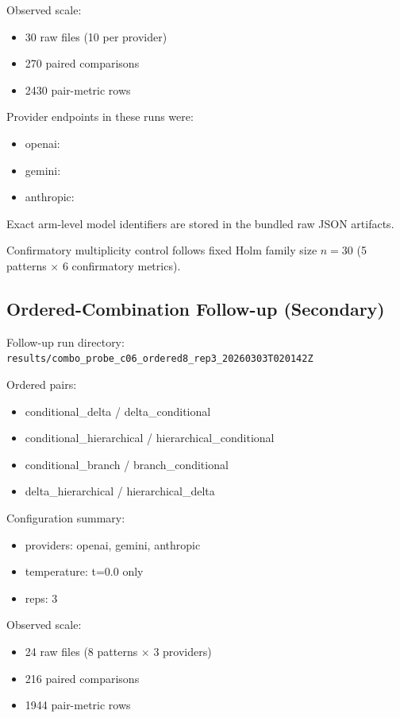\documentclass[11pt,a4paper]{article}
\begin{document}
Observed scale:
\begin{itemize}
  \item 30 raw files (10 per provider)
  \item 270 paired comparisons
  \item 2430 pair-metric rows
\end{itemize}

Provider endpoints in these runs were:
\begin{itemize}
  \item openai: 
  \item gemini: 
  \item anthropic: 
\end{itemize}
Exact arm-level model identifiers are stored in the bundled raw JSON artifacts.

Confirmatory multiplicity control follows fixed Holm family size $n=30$ (5 patterns $\times$ 6 confirmatory metrics).

\subsection{Ordered-Combination Follow-up (Secondary)}

Follow-up run directory:
\texttt{results/combo\_probe\_c06\_ordered8\_rep3\_20260303T020142Z}

Ordered pairs:
\begin{itemize}
  \item conditional\_delta / delta\_conditional
  \item conditional\_hierarchical / hierarchical\_conditional
  \item conditional\_branch / branch\_conditional
  \item delta\_hierarchical / hierarchical\_delta
\end{itemize}

Configuration summary:
\begin{itemize}
  \item providers: openai, gemini, anthropic
  \item temperature: t=0.0 only
  \item reps: 3
\end{itemize}

Observed scale:
\begin{itemize}
  \item 24 raw files (8 patterns $\times$ 3 providers)
  \item 216 paired comparisons
  \item 1944 pair-metric rows
\end{itemize}
\end{document}
